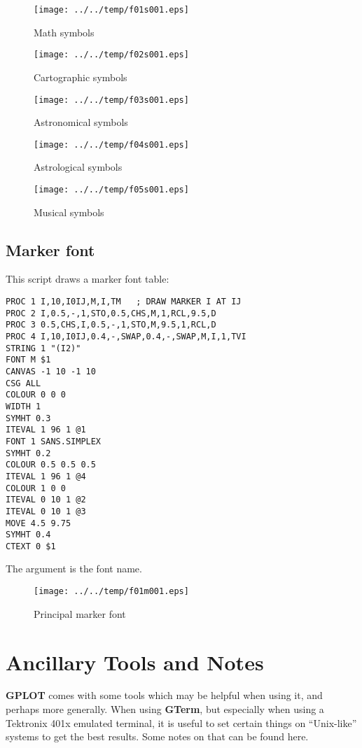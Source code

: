 \documentclass[a4paper,twoside,11pt]{article}
\makeatletter
\def\maxwidth{%
  \ifdim\Gin@nat@width>\linewidth
    \linewidth
  \else
    \Gin@nat@width
  \fi
}
\newcommand{\newpara}{\par\vspace{4mm}\noindent}
\makeatother
\begin{document}
\begin{figure}
  \centering
  \texttt{[image: ../../temp/f01s001.eps]}
  \caption{Math symbols}
  \label{fig:f01s001}
\end{figure}

\begin{figure}
  \centering
  \texttt{[image: ../../temp/f02s001.eps]}
  \caption{Cartographic symbols}
  \label{fig:f02s001}
\end{figure}

\clearpage
\begin{figure}
  \centering
  \texttt{[image: ../../temp/f03s001.eps]}
  \caption{Astronomical symbols}
  \label{fig:f03s001}
\end{figure}

\begin{figure}
  \centering
  \texttt{[image: ../../temp/f04s001.eps]}
  \caption{Astrological symbols}
  \label{fig:f04s001}
\end{figure}

\clearpage
\begin{figure}
  \centering
  \texttt{[image: ../../temp/f05s001.eps]}
  \caption{Musical symbols}
  \label{fig:f05s001}
\end{figure}

\subsection{Marker font}

\newpara
This script draws a marker font table:
\begin{lstlisting}
PROC 1 I,10,I0IJ,M,I,TM   ; DRAW MARKER I AT IJ
PROC 2 I,0.5,-,1,STO,0.5,CHS,M,1,RCL,9.5,D
PROC 3 0.5,CHS,I,0.5,-,1,STO,M,9.5,1,RCL,D
PROC 4 I,10,I0IJ,0.4,-,SWAP,0.4,-,SWAP,M,I,1,TVI
STRING 1 "(I2)"
FONT M $1 
CANVAS -1 10 -1 10
CSG ALL
COLOUR 0 0 0
WIDTH 1
SYMHT 0.3 
ITEVAL 1 96 1 @1
FONT 1 SANS.SIMPLEX 
SYMHT 0.2 
COLOUR 0.5 0.5 0.5
ITEVAL 1 96 1 @4
COLOUR 1 0 0
ITEVAL 0 10 1 @2
ITEVAL 0 10 1 @3
MOVE 4.5 9.75
SYMHT 0.4
CTEXT 0 $1
\end{lstlisting}
The argument is the font name.

\begin{figure}
  \centering
  \texttt{[image: ../../temp/f01m001.eps]}
  \caption{Principal marker font}
  \label{fig:f01m001}
\end{figure}


\section{Ancillary Tools and Notes}
\newpara
\textbf{GPLOT} comes with some tools which may be helpful when using it, and perhaps more generally.
When using \textbf{GTerm}, but especially when using a Tektronix 401x emulated terminal, it is useful to
set certain things on ``Unix-like'' systems to get the best results. Some notes on that can be found here.
\end{document}
